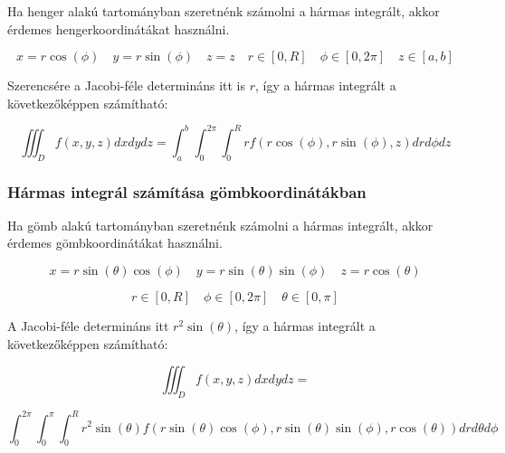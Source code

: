 \documentclass{article}
\begin{document}
Ha henger alakú tartományban szeretnénk számolni a hármas integrált, akkor érdemes hengerkoordinátákat használni.

\begin{equation*}
    x = r \cos(\phi) \quad y = r \sin(\phi) \quad z = z \quad r \in [0, R] \quad \phi \in [0, 2\pi] \quad z \in [a, b]
\end{equation*}

Szerencsére a Jacobi-féle determináns itt is $r$, így a hármas integrált a következőképpen számítható:

\begin{equation*}
    \iiint_{D} f(x,y,z) dx dy dz = \int_{a}^{b} \int_{0}^{2\pi} \int_{0}^{R} r f(r \cos(\phi), r \sin(\phi), z) dr d\phi dz
\end{equation*}

\subsubsection{Hármas integrál számítása gömbkoordinátákban}

Ha gömb alakú tartományban szeretnénk számolni a hármas integrált, akkor érdemes gömbkoordinátákat használni.

\begin{equation*}
    x = r \sin(\theta) \cos(\phi) \quad y = r \sin(\theta) \sin(\phi) \quad z = r \cos(\theta)
\end{equation*}

\begin{equation*}
    r \in [0, R] \quad \phi \in [0, 2\pi] \quad \theta \in [0, \pi]
\end{equation*}

A Jacobi-féle determináns itt $r^2 \sin(\theta)$, így a hármas integrált a kö\-vet\-ke\-ző\-kép\-pen számítható:

\begin{equation*}
    \iiint_{D} f(x,y,z) dx dy dz =
\end{equation*}

\begin{equation*}
    \int_{0}^{2\pi} \int_{0}^{\pi} \int_{0}^{R} r^2 \sin(\theta) f(r \sin(\theta) \cos(\phi), r \sin(\theta) \sin(\phi), r \cos(\theta)) dr d\theta d\phi
\end{equation*}
\end{document}
